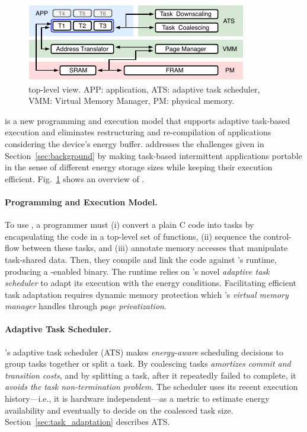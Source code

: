\begin{figure}
	\centering
	\includegraphics[width=.8\columnwidth]{figures/system-overview.pdf}
	\caption{\sys top-level view. APP: application, ATS: adaptive task scheduler, VMM: Virtual Memory Manager, PM: physical memory.}
	\label{fig:system_overview}
\end{figure}

\sys is a new programming and execution model that supports adaptive task-based execution and eliminates restructuring and re-compilation of applications considering the device's energy buffer. \sys addresses the challenges given in Section~\ref{sec:background} by making task-based intermittent applications portable in the sense of different energy storage sizes while keeping their execution efficient. Fig.~\ref{fig:system_overview} shows an overview of \sys.

\paragraph{Programming and Execution Model.}
To use \sys, a programmer must (i) convert a plain C code into tasks by encapsulating the code in a top-level set of functions, (ii) sequence the control-flow between these tasks, and (iii) annotate memory accesses that manipulate task-shared data. Then, they compile and link the code against \sys's runtime, producing a \sys-enabled binary. The runtime relies on \sys's novel {\em adaptive task scheduler} to adapt its execution with the energy conditions. Facilitating efficient task adaptation requires dynamic memory protection which \sys's \emph{virtual memory manager} handles through \emph{page privatization}.

\paragraph{Adaptive Task Scheduler.}
\sys's adaptive task scheduler (ATS) makes \emph{energy-aware} scheduling decisions to group tasks together or split a task. By coalescing tasks \sys \emph{amortizes commit and transition costs}, and by splitting a task, after it repeatedly failed to complete, it \emph{avoids the task non-termination problem}. The scheduler uses its recent execution history---i.e., it is hardware independent---as a metric to estimate energy availability and eventually to decide on the coalesced task size. Section~\ref{sec:task_adaptation} describes ATS.

